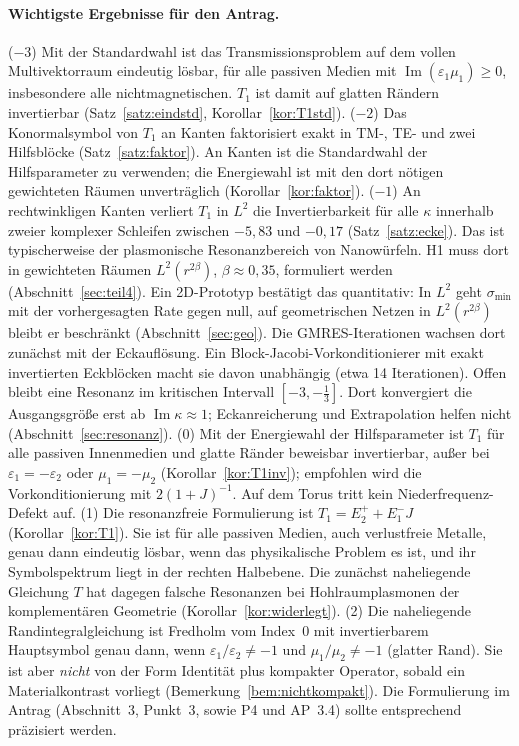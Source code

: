 \documentclass[11pt, a4paper]{article}
\theoremstyle{plain}
\theoremstyle{definition}
\begin{document}
\paragraph{Wichtigste Ergebnisse für den Antrag.} ($-3$) Mit der Standardwahl
ist das Transmissionsproblem auf dem vollen Multivektorraum eindeutig lösbar, für
alle passiven Medien mit $\operatorname{Im}(\varepsilon_1\mu_1)\ge0$, insbesondere
alle nichtmagnetischen. $T_1$ ist damit auf glatten Rändern invertierbar
(Satz~\ref{satz:eindstd}, Korollar~\ref{kor:T1std}). ($-2$) Das Konormalsymbol von
$T_1$ an Kanten faktorisiert exakt in TM-, TE- und zwei Hilfsblöcke
(Satz~\ref{satz:faktor}). An Kanten ist die Standardwahl der Hilfsparameter zu
verwenden; die Energiewahl ist mit den dort nötigen gewichteten Räumen
unverträglich (Korollar~\ref{kor:faktor}). ($-1$) An rechtwinkligen
Kanten verliert $T_1$ in $L^2$ die Invertierbarkeit für alle $\kappa$ innerhalb
zweier komplexer Schleifen zwischen $-5{,}83$ und $-0{,}17$
(Satz~\ref{satz:ecke}). Das ist typischerweise der plasmonische Resonanzbereich von
Nanowürfeln. H1 muss dort in gewichteten Räumen $L^2(r^{2\beta})$,
$\beta\approx0{,}35$, formuliert werden (Abschnitt~\ref{sec:teil4}). Ein 2D-Prototyp
bestätigt das quantitativ: In $L^2$ geht $\sigma_{\min}$ mit der vorhergesagten Rate
gegen null, auf geometrischen Netzen in $L^2(r^{2\beta})$ bleibt er beschränkt
(Abschnitt~\ref{sec:geo}). Die GMRES-Iterationen wachsen dort zunächst mit der
Eckauflösung. Ein Block-Jacobi-Vorkonditionierer mit exakt invertierten Eckblöcken
macht sie davon unabhängig (etwa 14 Iterationen). Offen bleibt eine Resonanz im kritischen
Intervall $[-3,-\tfrac13]$. Dort konvergiert die Ausgangsgröße erst ab
$\operatorname{Im}\kappa\approx1$; Eckanreicherung und Extrapolation helfen nicht
(Abschnitt~\ref{sec:resonanz}). (0) Mit der Energiewahl
der Hilfsparameter ist $T_1$ für alle passiven Innenmedien und glatte Ränder
beweisbar invertierbar, außer bei $\varepsilon_1=-\varepsilon_2$ oder $\mu_1=-\mu_2$
(Korollar~\ref{kor:T1inv}); empfohlen wird die Vorkonditionierung mit
$2(1+J)^{-1}$. Auf dem Torus tritt kein Niederfrequenz-Defekt auf. (1) Die resonanzfreie
Formulierung ist $T_1 = E_2^+ + E_1^-J$ (Korollar~\ref{kor:T1}). Sie ist für alle
passiven Medien, auch verlustfreie Metalle, genau dann eindeutig lösbar, wenn das
physikalische Problem es ist, und ihr Symbolspektrum liegt in der rechten
Halbebene. Die zunächst naheliegende Gleichung $T$ hat dagegen falsche
Resonanzen bei Hohlraumplasmonen der komplementären Geometrie
(Korollar~\ref{kor:widerlegt}). (2) Die naheliegende
Randintegralgleichung ist Fredholm vom Index~0 mit invertierbarem Hauptsymbol
genau dann, wenn $\varepsilon_1/\varepsilon_2 \neq -1$ und $\mu_1/\mu_2\neq-1$
(glatter Rand). Sie ist aber \emph{nicht} von der Form Identität plus kompakter
Operator, sobald ein Materialkontrast vorliegt (Bemerkung~\ref{bem:nichtkompakt}).
Die Formulierung im Antrag (Abschnitt~3, Punkt~3, sowie P4 und AP~3.4) sollte
entsprechend präzisiert werden.
\end{document}
